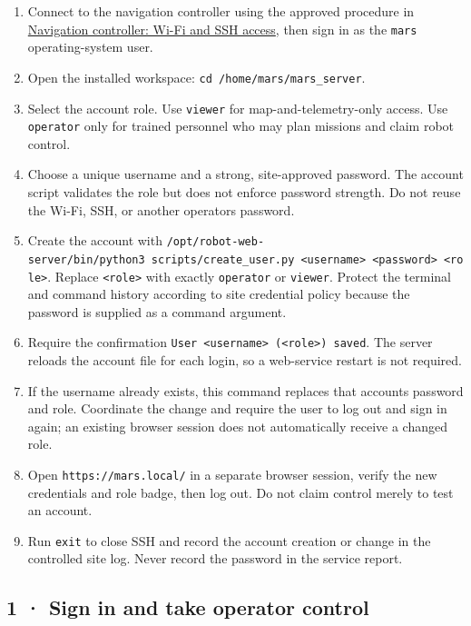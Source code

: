 \documentclass[
  10pt,
  letterpaper,
  openany]{report}
\providecommand{\tightlist}{%
  \setlength{\itemsep}{0pt}\setlength{\parskip}{0pt}}
\begin{document}
\begin{enumerate}
\tightlist
\item
  Connect to the navigation controller using the approved procedure in
  \hyperref[nav-technician-access]{Navigation controller: Wi-Fi and SSH
  access}, then sign in as the \texttt{mars} operating-system user.
\item
  Open the installed workspace: \texttt{cd\ /home/mars/mars\_server}.
\item
  Select the account role. Use \texttt{viewer} for
  map-and-telemetry-only access. Use \texttt{operator} only for trained
  personnel who may plan missions and claim robot control.
\item
  Choose a unique username and a strong, site-approved password. The
  account script validates the role but does not enforce password
  strength. Do not reuse the Wi-Fi, SSH, or another
  operator\textquotesingle s password.
\item
  Create the account with
  \texttt{/opt/robot-web-server/bin/python3\ scripts/create\_user.py\ \textless{}username\textgreater{}\ \textquotesingle{}\textless{}password\textgreater{}\textquotesingle{}\ \textless{}role\textgreater{}}.
  Replace \texttt{\textless{}role\textgreater{}} with exactly
  \texttt{operator} or \texttt{viewer}. Protect the terminal and command
  history according to site credential policy because the password is
  supplied as a command argument.
\item
  Require the confirmation
  \texttt{User\ \textquotesingle{}\textless{}username\textgreater{}\textquotesingle{}\ (\textless{}role\textgreater{})\ saved}.
  The server reloads the account file for each login, so a web-service
  restart is not required.
\item
  If the username already exists, this command replaces that
  account\textquotesingle s password and role. Coordinate the change and
  require the user to log out and sign in again; an existing browser
  session does not automatically receive a changed role.
\item
  Open \texttt{https://mars.local/} in a separate browser session,
  verify the new credentials and role badge, then log out. Do not claim
  control merely to test an account.
\item
  Run \texttt{exit} to close SSH and record the account creation or
  change in the controlled site log. Never record the password in the
  service report.
\end{enumerate}

\subsection{1 · Sign in and take operator
control}\label{sign-in-and-take-operator-control}
\end{document}
